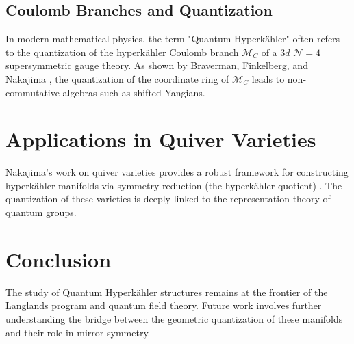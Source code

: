 \documentclass[11pt,a4paper]{article}
\newcommand{\HK}{hyperk\"{a}hler }
\begin{document}
\subsection{Coulomb Branches and Quantization}
In modern mathematical physics, the term "Quantum Hyperk\"{a}hler" often refers to the quantization of the \HK Coulomb branch $\mathcal{M}_C$ of a $3d$ $\mathcal{N}=4$ supersymmetric gauge theory. As shown by Braverman, Finkelberg, and Nakajima \cite{Braverman2016}, the quantization of the coordinate ring of $\mathcal{M}_C$ leads to non-commutative algebras such as shifted Yangians.

\section{Applications in Quiver Varieties}
Nakajima's work on quiver varieties provides a robust framework for constructing \HK manifolds via symmetry reduction (the \HK quotient) \cite{Nakajima1994}. The quantization of these varieties is deeply linked to the representation theory of quantum groups.

\section{Conclusion}
The study of Quantum Hyperk\"{a}hler structures remains at the frontier of the Langlands program and quantum field theory. Future work involves further understanding the bridge between the geometric quantization of these manifolds and their role in mirror symmetry.



\end{document}
